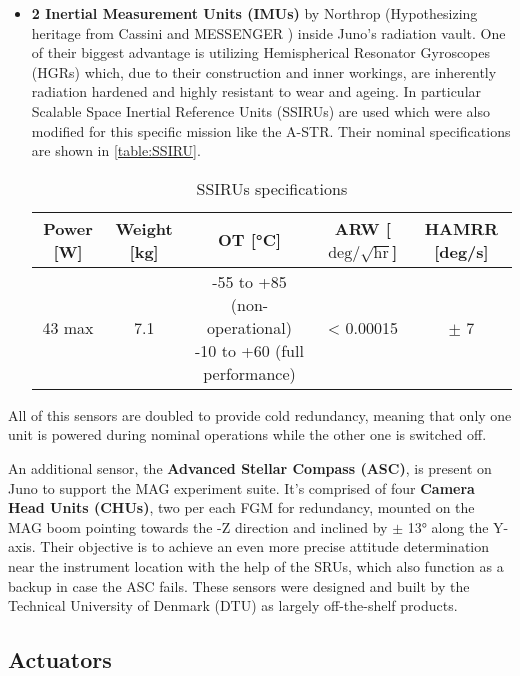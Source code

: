 \begin{itemize}
    \item \textbf{2 Inertial Measurement Units (IMUs)} by Northrop (Hypothesizing heritage from Cassini \cite{gyro_evaluation} and MESSENGER \cite{messenger_imu}) inside Juno's radiation vault. One of their biggest advantage is utilizing Hemispherical Resonator Gyroscopes (HGRs) which, due to their construction and inner workings, are inherently radiation hardened and highly resistant to wear and ageing. In particular Scalable Space Inertial Reference Units (SSIRUs) \cite{SSIRU} are used which were also modified for this specific mission like the A-STR. Their nominal specifications are shown in \autoref{table:SSIRU}.
     
    \begin{table}[H]
        \renewcommand{\arraystretch}{1.3}
        \centering
        \small
        \begin{tabular}{|c|c|c|c|c|}
            \hline
            \textbf{Power [W]} & \textbf{Weight [kg]} & \textbf{OT [°C]} & \textbf{ARW [$\textrm{deg} / \sqrt{\textrm{hr}}$]} & \textbf{HAMRR [deg/s]} \\
            \hline
            \hline
            43 max & 7.1 & \makecell{-55 to +85 (non-operational) \\  -10 to +60 (full performance)} & < 0.00015 & $\pm$ 7 \\
            \hline
        \end{tabular}
        \caption{SSIRUs specifications}
        \label{table:SSIRU}
    \end{table}
\end{itemize}

All of this sensors are doubled to provide cold redundancy, meaning that only one unit is powered during nominal operations while the other one is switched off.

An additional sensor, the \textbf{Advanced Stellar Compass (ASC)}, is present on Juno to support the MAG experiment suite. It's comprised of four \textbf{Camera Head Units (CHUs)}, two per each FGM for redundancy, mounted on the MAG boom pointing towards the -Z direction and inclined by $\pm$ 13° along the Y-axis. Their objective is to achieve an even more precise attitude determination near the instrument location with the help of the SRUs, which also function as a backup in case the ASC fails. These sensors were designed and built by the Technical University of Denmark (DTU) as largely off-the-shelf products. \cite{ASC_details}

\subsection{Actuators}
\label{subsec:Actuators}

